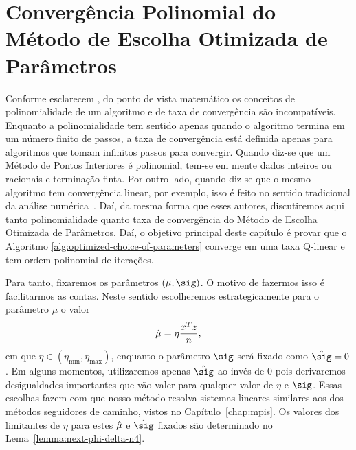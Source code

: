 




\chapter{Convergência  Polinomial do Método de Escolha Otimizada de Parâmetros}


\label{chap:convergence}


Conforme esclarecem \textcite{Zhang:1993gn}, do ponto de vista matemático os conceitos de polinomialidade de um algoritmo e de taxa de convergência são incompatíveis. Enquanto a polinomialidade tem sentido apenas quando o algoritmo termina em um número finito de passos, a taxa de convergência  está definida apenas para algoritmos que tomam infinitos passos para convergir. Quando diz-se que um Método de Pontos Interiores é polinomial, tem-se em mente dados inteiros ou racionais e terminação finta. Por outro lado, quando diz-se que o mesmo algoritmo tem convergência linear, por exemplo, isso é feito  no sentido tradicional da análise numérica~\cite{Ortega:2000vd}.
Daí, da mesma forma que esses autores, discutiremos aqui tanto polinomialidade quanto taxa de convergência do Método de Escolha Otimizada de Parâmetros. Daí, o objetivo principal  deste capítulo é   provar  que o Algoritmo \ref{alg:optimized-choice-of-parameters} converge em uma taxa Q-linear e tem ordem polinomial de iterações.






 Para tanto,  fixaremos os parâmetros $(\mu,\sig)$. O motivo de fazermos isso é facilitarmos as contas. Neste sentido escolheremos estrategicamente  para o parâmetro  $\mu$ o valor \[\hat{\mu}=\eta\dfrac{x^Tz}{n},
\] 
em que $\eta\in (\eta_{\min},\eta_{\max} )$, enquanto o parâmetro $\sig$ será fixado como $\nextsig =0 $. Em alguns momentos, utilizaremos apenas $\nextsig$ ao invés de $0$ pois derivaremos desigualdades importantes que vão valer para qualquer valor de $\eta$ e $\sig$. Essas escolhas  fazem com que nosso método resolva  sistemas lineares similares aos dos métodos seguidores de caminho, vistos no Capítulo~\ref{chap:mpis}. Os valores dos limitantes de $\eta$ para  estes $\hat{\mu}$  e $\nextsig$ fixados são determinado no Lema~\ref{lemma:next-phi-delta-n4}.


